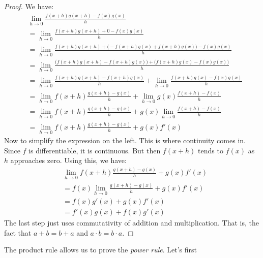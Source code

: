 \documentclass{article}
\theoremstyle{plain}
\begin{document}
    \begin{proof}
        We have:
        \begin{align}
            &\lim_{h\rightarrow{0}}
                \frac{f(x+h)g(x+h)-f(x)g(x)}{h}\nonumber\\
            &=\lim_{h\rightarrow{0}}\frac{f(x+h)g(x+h)+0-f(x)g(x)}{h}\\
            &=\lim_{h\rightarrow{0}}
                \frac{f(x+h)g(x+h)+\big(-f(x+h)g(x)+f(x+h)g(x)\big)-f(x)g(x)}
                     {h}\\
            &=\lim_{h\rightarrow{0}}
                \frac{\big(f(x+h)g(x+h)-f(x+h)g(x)\big)
                      +\big(f(x+h)g(x)-f(x)g(x)\big)}{h}\\
            &=
                \lim_{h\rightarrow{0}}
                \frac{f(x+h)g(x+h)-f(x+h)g(x)}{h}+
                \lim_{h\rightarrow{0}}
                    \frac{f(x+h)g(x)-f(x)g(x)}{h}\\
            &=\lim_{h\rightarrow{0}}
                f(x+h)\frac{g(x+h)-g(x)}{h}+
                \lim_{h\rightarrow{0}}g(x)
                    \frac{f(x+h)-f(x)}{h}\\
                    &=\lim_{h\rightarrow{0}}
                        f(x+h)\frac{g(x+h)-g(x)}{h}+
                        g(x)\lim_{h\rightarrow{0}}
                        \frac{f(x+h)-f(x)}{h}\\
                    &=\lim_{h\rightarrow{0}}
                        f(x+h)\frac{g(x+h)-g(x)}{h}+
                        g(x)f'(x)
        \end{align}
        Now to simplify the expression on the left. This is where
        continuity comes in. Since $f$ is differentiable, it is continuous.
        But then $f(x+h)$ tends to $f(x)$ as $h$ approaches zero. Using this, we
        have:
        \begin{align}
            &\lim_{h\rightarrow{0}}
                f(x+h)\frac{g(x+h)-g(x)}{h}+g(x)f'(x)\nonumber\\
            &=f(x)\lim_{h\rightarrow{0}}\frac{g(x+h)-g(x)}{h}+g(x)f'(x)\\
            &=f(x)g'(x)+g(x)f'(x)\\
            &=f'(x)g(x)+f(x)g'(x)
        \end{align}
        The last step just uses commutativity of addition and multiplication.
        That is, the fact that $a+b=b+a$ and $a\cdot{b}=b\cdot{a}$.
    \end{proof}
    The product rule allows us to prove the \textit{power rule}. Let's first
\end{document}
